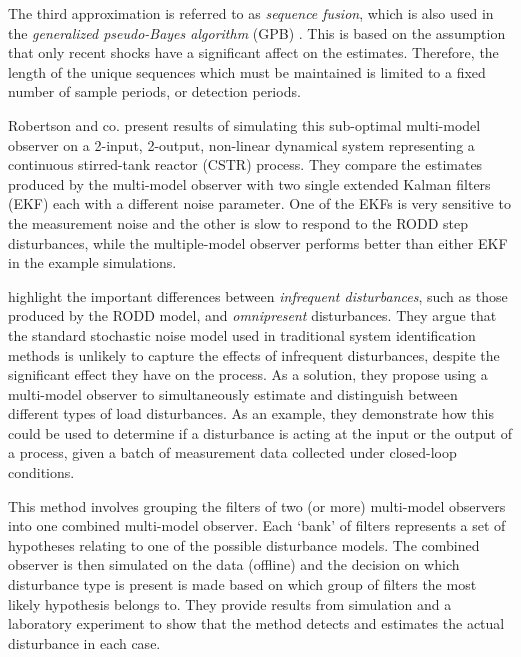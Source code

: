 The third approximation is referred to as \textit{sequence fusion}, which is also used in the \textit{generalized pseudo-Bayes algorithm} (GPB) \citep{jaffer_estimation_1971, buxbaum_recursive_1970, tugnait_detection_1982}. This is based on the assumption that only recent shocks have a significant affect on the estimates. Therefore, the length of the unique sequences which must be maintained is limited to a fixed number of sample periods, or detection periods.

Robertson and co. present results of simulating this sub-optimal multi-model observer on a 2-input, 2-output, non-linear dynamical system representing a continuous stirred-tank reactor (CSTR) process. They compare the estimates produced by the multi-model observer with two single extended Kalman filters (EKF) each with a different noise parameter. One of the EKFs is very sensitive to the measurement noise and the other is slow to respond to the RODD step disturbances, while the multiple-model observer performs better than either EKF in the example simulations.

\cite{eriksson_classification_1996} highlight the important differences between \textit{infrequent disturbances}, such as those produced by the RODD model, and \textit{omnipresent} disturbances. They argue that the standard stochastic noise model used in traditional system identification methods is unlikely to capture the effects of infrequent disturbances, despite the significant effect they have on the process. As a solution, they propose using a multi-model observer to simultaneously estimate and distinguish between different types of load disturbances. As an example, they demonstrate how this could be used to determine if a disturbance is acting at the input or the output of a process, given a batch of measurement data collected under closed-loop conditions.

This method involves grouping the filters of two (or more) multi-model observers into one combined multi-model observer. Each `bank' of filters represents a set of hypotheses relating to one of the possible disturbance models. The combined observer is then simulated on the data (offline) and the decision on which disturbance type is present is made based on which group of filters the most likely hypothesis belongs to. They provide results from simulation and a laboratory experiment to show that the method detects and estimates the actual disturbance in each case.


